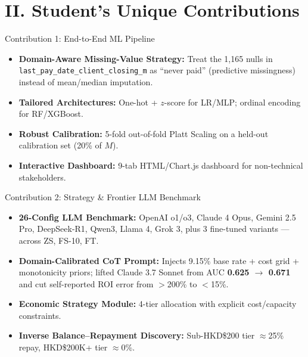 \documentclass[10pt]{beamer}
\begin{document}
\section{II. Student's Unique Contributions}

\begin{frame}{\textrm{Contribution 1: End-to-End ML Pipeline}}
    \begin{itemize}
        \item \textbf{Domain-Aware Missing-Value Strategy:} Treat the 1{,}165 nulls in \texttt{last\_pay\_date\_client\_closing\_m} as ``never paid'' (predictive missingness) instead of mean/median imputation.
        \item \textbf{Tailored Architectures:} One-hot + $z$-score for LR/MLP; ordinal encoding for RF/XGBoost.
        \item \textbf{Robust Calibration:} 5-fold out-of-fold Platt Scaling on a held-out calibration set (20\% of $M$).
        \item \textbf{Interactive Dashboard:} 9-tab HTML/Chart.js dashboard for non-technical stakeholders.
    \end{itemize}
\end{frame}

\begin{frame}{\textrm{Contribution 2: Strategy \& Frontier LLM Benchmark}}
    \begin{itemize}
        \item \textbf{26-Config LLM Benchmark:} OpenAI o1/o3, Claude 4 Opus, Gemini 2.5 Pro, DeepSeek-R1, Qwen3, Llama 4, Grok 3, plus 3 fine-tuned variants --- across ZS, FS-10, FT.
        \item \textbf{Domain-Calibrated CoT Prompt:} Injects 9.15\% base rate + cost grid + monotonicity priors; lifted Claude 3.7 Sonnet from AUC \textbf{0.625 $\to$ 0.671} and cut self-reported ROI error from $>$200\% to $<$15\%.
        \item \textbf{Economic Strategy Module:} 4-tier allocation with explicit cost/capacity constraints.
        \item \textbf{Inverse Balance--Repayment Discovery:} Sub-HKD\$200 tier $\approx$25\% repay, HKD\$200K+ tier $\approx$0\%.
    \end{itemize}
\end{frame}

\end{document}
